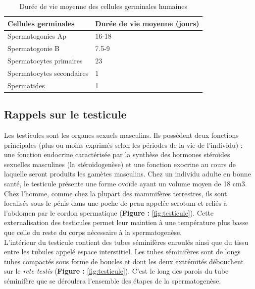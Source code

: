 \documentclass[12pt,twoside]{reedthesis}
\theoremstyle{definition}
\theoremstyle{definition}
\theoremstyle{remark}
\begin{document}
  \begin{table}
  
  \caption{\label{tab:spermatotime}Durée de vie moyenne des cellules germinales humaines}
  \centering
  \begin{tabular}[t]{l|l}
  \hline
  Cellules germinales & Durée de vie moyenne (jours)\\
  \hline
  Spermatogonies Ap & 16-18\\
  \hline
  Spermatogonie B & 7.5-9\\
  \hline
  Spermatocytes primaires & 23\\
  \hline
  Spermatocytes secondaires & 1\\
  \hline
  Spermatides & 1\\
  \hline
  \end{tabular}
  \end{table}
  
  \subsection{Rappels sur le testicule}\label{rappels-sur-le-testicule}
  
  Les testicules sont les organes sexuels masculins. Ils possèdent deux
  fonctions principales (plus ou moins exprimés selon les périodes de la
  vie de l'individu) : une fonction endocrine caractérisée par la synthèse
  des hormones stéroïdes sexuelles masculines (la stéroïdogenèse) et une
  fonction exocrine au cours de laquelle seront produits les gamètes
  masculins. Chez un individu adulte en bonne santé, le testicule présente
  une forme ovoïde ayant un volume moyen de 18 cm3. Chez l'homme, comme
  chez la plupart des mammifères terrestres, ils sont localisés sous le
  pénis dans une poche de peau appelée scrotum et reliés à l'abdomen par
  le cordon spermatique (\textbf{Figure :} \ref{fig:testicule}). Cette
  externalisation des testicules permet leur maintien à une température
  plus basse que celle du reste du corps nécessaire à la spermatogenèse.\\
  L'intérieur du testicule contient des tubes séminifères enroulés ainsi
  que du tissu entre les tubules appelé espace interstitiel. Les tubes
  séminifères sont de longs tubes compactés sous forme de boucles et dont
  les deux extrémités débouchent sur le \emph{rete testis} (\textbf{Figure
  :} \ref{fig:testicule}). C'est le long des parois du tube séminifère que
  se déroulera l'ensemble des étapes de la spermatogenèse.
  
\end{document}
